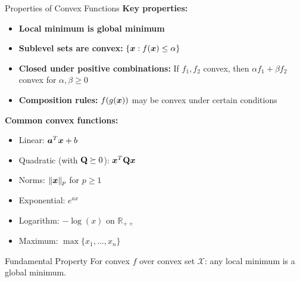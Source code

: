 \documentclass[aspectratio=169]{beamer}
\begin{document}
\begin{frame}{Properties of Convex Functions}
  \textbf{Key properties:}
  \begin{itemize}
    \item \textbf{Local minimum is global minimum}
    \item \textbf{Sublevel sets are convex:} $\{\boldsymbol{x} : f(\boldsymbol{x}) \leq \alpha\}$
    \item \textbf{Closed under positive combinations:} If $f_1, f_2$ convex, then $\alpha f_1 + \beta f_2$ convex for $\alpha, \beta \geq 0$
    \item \textbf{Composition rules:} $f(g(\boldsymbol{x}))$ may be convex under certain conditions
  \end{itemize}

  \vspace{0.5em}

  \textbf{Common convex functions:}
  \begin{itemize}
    \item Linear: $\boldsymbol{a}^T\boldsymbol{x} + b$
    \item Quadratic (with $\mathbf{Q} \succeq 0$): $\boldsymbol{x}^T\mathbf{Q}\boldsymbol{x}$
    \item Norms: $\|\boldsymbol{x}\|_p$ for $p \geq 1$
    \item Exponential: $e^{ax}$
    \item Logarithm: $-\log(x)$ on $\mathbb{R}_{++}$
    \item Maximum: $\max\{x_1, \ldots, x_n\}$
  \end{itemize}

  \vspace{0.5em}

  \begin{theorembox}{Fundamental Property}
    For convex $f$ over convex set $\mathcal{X}$: any local minimum is a global minimum.
  \end{theorembox}
\end{frame}
\end{document}
